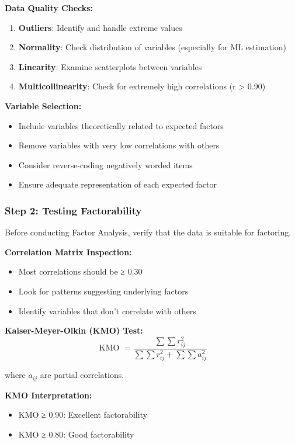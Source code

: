 \documentclass[
]{article}
\begin{document}
\textbf{Data Quality Checks:}

\begin{enumerate}
\item
  \textbf{Outliers}: Identify and handle extreme values
\item
  \textbf{Normality}: Check distribution of variables (especially for ML
  estimation)
\item
  \textbf{Linearity}: Examine scatterplots between variables
\item
  \textbf{Multicollinearity}: Check for extremely high correlations (r
  \textgreater{} 0.90)
\end{enumerate}

\textbf{Variable Selection:}

\begin{itemize}
\item
  Include variables theoretically related to expected factors
\item
  Remove variables with very low correlations with others
\item
  Consider reverse-coding negatively worded items
\item
  Ensure adequate representation of each expected factor
\end{itemize}

\subsubsection{Step 2: Testing Factorability}

Before conducting Factor Analysis, verify that the data is suitable for
factoring.

\textbf{Correlation Matrix Inspection:}

\begin{itemize}
\item
  Most correlations should be ≥ 0.30
\item
  Look for patterns suggesting underlying factors
\item
  Identify variables that don't correlate with others
\end{itemize}

\textbf{Kaiser-Meyer-Olkin (KMO) Test:}
\[\text{ KMO } = \frac{\sum\sum r_{ij}^{2}}{\sum\sum r_{ij}^{2} + \sum\sum a_{ij}^{2}}\]

where \(a_{ij}\) are partial correlations.

\textbf{KMO Interpretation:}

\begin{itemize}
\item
  KMO ≥ 0.90: Excellent factorability
\item
  KMO ≥ 0.80: Good factorability
\end{itemize}
\end{document}
